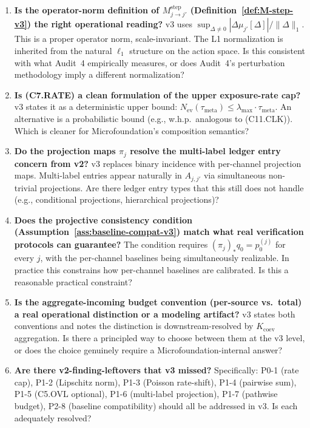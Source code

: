 \documentclass{article}
\newcommand{\Nev}{N_{\mathrm{ev}}}
\newcommand{\lammax}{\lambda_{\max}}
\newcommand{\taumeta}{\tau_{\mathrm{meta}}}
\begin{document}
\begin{enumerate}
\item \textbf{Is the operator-norm definition of
  $M_{j \to j'}^{\mathrm{step}}$
  (Definition~\ref{def:M-step-v3}) the right operational reading?}
  v3 uses $\sup_{\Delta \neq 0} |\Delta\mu_{j'}[\Delta]|/\|\Delta\|_1$.
  This is a proper operator norm, scale-invariant.  The L1
  normalization is inherited from the natural $\ell_1$ structure
  on the action space.  Is this consistent with what Audit~4
  empirically measures, or does Audit~4's perturbation methodology
  imply a different normalization?

\item \textbf{Is (C7.RATE) a clean formulation of the upper
  exposure-rate cap?}  v3 states it as a deterministic upper
  bound: $\Nev(\taumeta) \leq \lammax \cdot \taumeta$.  An
  alternative is a probabilistic bound (e.g., w.h.p.\ analogous to
  (C11.CLK)).  Which is cleaner for Microfoundation's composition
  semantics?

\item \textbf{Do the projection maps $\pi_j$ resolve the multi-label
  ledger entry concern from v2?}  v3 replaces binary incidence with
  per-channel projection maps.  Multi-label entries appear
  naturally in $A_{j, j'}$ via simultaneous non-trivial
  projections.  Are there ledger entry types that this still does
  not handle (e.g., conditional projections, hierarchical
  projections)?

\item \textbf{Does the projective consistency condition
  (Assumption~\ref{ass:baseline-compat-v3}) match what real
  verification protocols can guarantee?}  The condition requires
  $(\pi_j)_* q_0 = p_0^{(j)}$ for every $j$, with the per-channel
  baselines being simultaneously realizable.  In practice this
  constrains how per-channel baselines are calibrated.  Is this a
  reasonable practical constraint?

\item \textbf{Is the aggregate-incoming budget convention
  (per-source vs.\ total) a real operational distinction or a
  modeling artifact?}  v3 states both conventions and notes the
  distinction is downstream-resolved by $K_{\mathrm{coev}}$
  aggregation.  Is there a principled way to choose between them
  at the v3 level, or does the choice genuinely require a
  Microfoundation-internal answer?

\item \textbf{Are there v2-finding-leftovers that v3 missed?}
  Specifically: P0-1 (rate cap), P1-2 (Lipschitz norm), P1-3
  (Poisson rate-shift), P1-4 (pairwise sum), P1-5 (C5.OVL
  optional), P1-6 (multi-label projection), P1-7 (pathwise
  budget), P2-8 (baseline compatibility) should all be addressed
  in v3.  Is each adequately resolved?
\end{enumerate}
\end{document}
